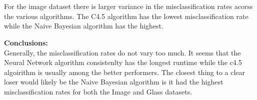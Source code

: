\documentclass{article}
\begin{document}
\begin{enumerate}[label = (\alph*), left=10pt, itemsep=10pt]
\begin{minipage}[t]{0.9\textwidth}
\begin{figure}[H]
            \end{figure}
        \end{minipage}\\
        \vspace*{10pt}\\
        \begin{minipage}[t]{0.9\textwidth}
            For the image dataset there is larger variance in the misclassification rates acorss the various algorithms. The C4.5 algorithm
            has the lowest misclassification rate while the Naive Bayesian algorithm has the highest.
        \end{minipage}
    \end{enumerate}

    \begin{minipage}[t]{0.9\textwidth}
        \textbf{Conclusions:}\\
        Generally, the misclassification rates do not vary too much. It seems that the Neural Network algorithm consistenlty has the longest runtime
        while the c4.5 algoirithm is usually among the better performers. The closest thing to a clear loser would likely be the Naive Bayesian
        algorithm is it had the highest misclassification rates for both the Image and Glass datasets.
    \end{minipage}
\end{document}
